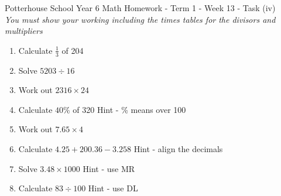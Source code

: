 \documentclass{article}
\date{}
\begin{document}
\fontsize{12}{13} \selectfont %

\begin{center}
Potterhouse School \hspace{2cm} Year 6 Math \hspace{2cm}  Homework - Term 1 - Week 13 - Task (iv)  \\ 
\vspace{8pt}
 \textit{You must show your working including the times tables for the divisors and multipliers}
\end{center}
\vspace{5pt}

\begin{enumerate}

\item \quad Calculate \hspace{3cm}  \( \displaystyle \frac{1}{3} \) of \Large 204 \\ 

\item \quad Solve \hspace{3cm} \( \displaystyle 5203 \div 16 \) \\

\item \quad Work out \hspace{3cm} \( \displaystyle 2316 \times 24 \) \\ 

\item \quad Calculate \hspace{3cm} \( \displaystyle 40 \% \) of \Large 320 
\quad Hint -  \% means over 100 \\

\item \quad Work out \hspace{3cm} \( \displaystyle 7.65 \times 4 \) \\

\item \quad Calculate \hspace{3cm} \( \displaystyle 4.25 + 200.36 - 3.258 \) 
\quad Hint - align the decimals \\ 

\item \quad Solve \hspace{3cm} \( \displaystyle 3.48 \times 1000 \) 
\quad Hint - use MR \\ 

\item \quad Calculate \hspace{3cm} \( \displaystyle 83 \div 100 \) 
\quad Hint - use DL  \\ 


\end{enumerate}
\end{document}
